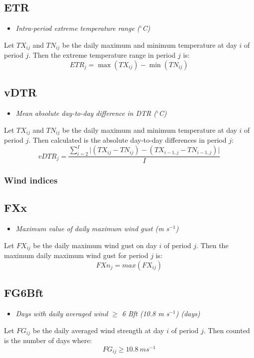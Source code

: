 \documentclass[a4paper,11pt]{article}
\begin{document}
\subsection*{ETR}
\begin{itemize}
\item \textit{Intra-period extreme temperature range ($^\circ$C)}
\end{itemize}
Let $TX_{ij}$ and $TN_{ij}$ be the daily maximum and minimum
temperature at day $i$ of period $j$. Then the extreme temperature
range in period $j$ is:
\begin{equation*}
ETR_{j} = \max{(TX_{ij})} - \min{(TN_{ij})}
\end{equation*}

\subsection*{vDTR}
\begin{itemize}
\item \textit{Mean absolute day-to-day difference in DTR ($^\circ$C)}
\end{itemize}
Let $TX_{ij}$ and $TN_{ij}$ be the daily maximum and minimum
temperature at day $i$ of period $j$. Then calculated is the absolute
day-to-day differences in period $j$:
\begin{equation*}
vDTR_{j} = \frac{\sum_{i=2}^{I} \vert (TX_{ij} -
TN_{ij})-(TX_{i-1,j} - TN_{i-1,j}) \vert }{I}
\end{equation*}

\subsubsection{Wind indices}

\subsection*{FXx}
\begin{itemize}
\item \textit{Maximum value of daily maximum wind gust (m s$^{-1}$)}
\end{itemize}
Let $FX_{ij}$ be the daily maximum wind gust on day $i$ of period
$j$. Then the maximum daily maximum wind gust for period $j$ is:
\begin{equation*}
FXn_{j} = max(FX_{ij})
\end{equation*}

\subsection*{FG6Bft}
\begin{itemize}
\item \textit{Days with daily averaged wind $\ge$ 6 Bft (10.8 m s$^{-1}$) (days)}
\end{itemize}
Let $FG_{ij}$ be the daily averaged wind strength at day $i$ of period
$j$. Then counted is the number of days where:
\begin{equation*}
FG_{ij} \ge 10.8\:m s^{-1}
\end{equation*}
\end{document}
